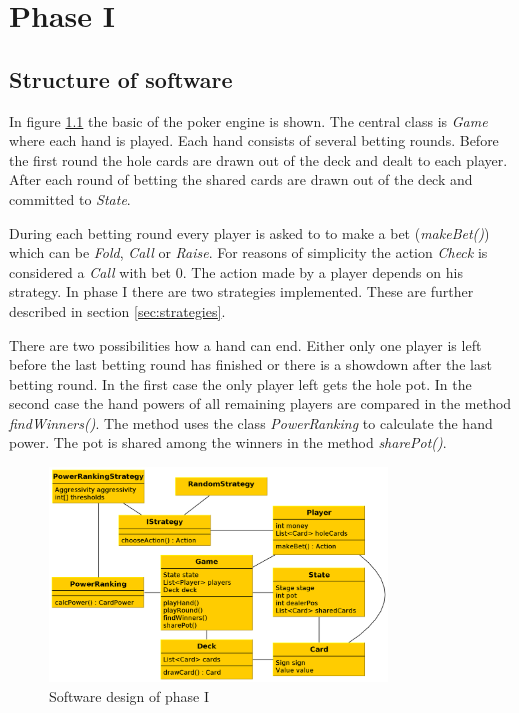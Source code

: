 \chapter{Phase I}

\section{Structure of software}
In figure \ref{fig:phase1} the basic of the poker engine is shown. The central class is \emph{Game} where each hand is played. Each hand consists of several betting rounds. Before the first round the hole cards are drawn out of the deck and dealt to each player. After each round of betting the shared cards are drawn out of the deck and committed to \emph{State}.

During each betting round every player is asked to to make a bet (\emph{makeBet()}) which can be \emph{Fold}, \emph{Call} or \emph{Raise}. For reasons of simplicity the action \emph{Check} is considered a \emph{Call} with bet 0. The action made by a player depends on his strategy. In phase I there are two strategies implemented. These are further described in section \ref{sec:strategies}.

There are two possibilities how a hand can end. Either only one player is left before the last betting round has finished or there is a showdown after the last betting round. In the first case the only player left gets the hole pot. In the second case the hand powers of all remaining players are compared in the method \emph{findWinners()}. The method uses the class \emph{PowerRanking} to calculate the hand power. The pot is shared among the winners in the method \emph{sharePot()}.

\begin{figure}[h]
  \centering
  \includegraphics[width=0.8\textwidth]{images/phase1}
  \caption{Software design of phase I}
  \label{fig:phase1}
\end{figure}

